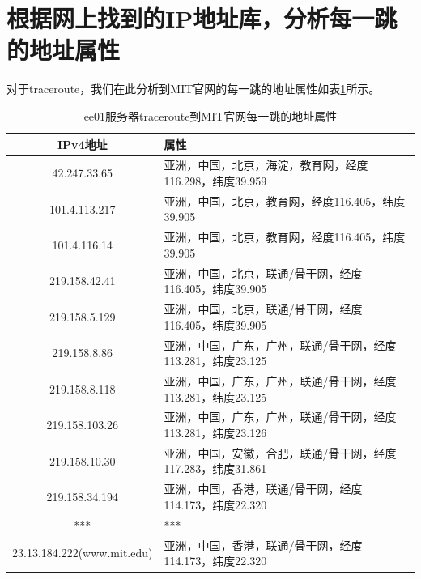 \documentclass[12pt,letterpaper]{article}
\begin{document}
\section{根据网上找到的IP地址库，分析每一跳的地址属性}
对于traceroute，我们在此分析到MIT官网的每一跳的地址属性如表\ref{tab7}所示。
\begin{table}[!h]
	\centering
	\caption{\label{tab7}ee01服务器traceroute到MIT官网每一跳的地址属性}
	\begin{tabular}{|c|p{11.8cm}|}
		\hline
		IPv4地址 & 属性 \\
		\hline
		42.247.33.65 & 亚洲，中国，北京，海淀，教育网，经度116.298，纬度39.959 \\
		\hline
		101.4.113.217 & 亚洲，中国，北京，教育网，经度116.405，纬度39.905 \\
		\hline
		101.4.116.14 & 亚洲，中国，北京，教育网，经度116.405，纬度39.905 \\
		\hline
		219.158.42.41 & 亚洲，中国，北京，联通/骨干网，经度116.405，纬度39.905 \\
		\hline
		219.158.5.129 & 亚洲，中国，北京，联通/骨干网，经度116.405，纬度39.905 \\
		\hline
		219.158.8.86 & 亚洲，中国，广东，广州，联通/骨干网，经度113.281，纬度23.125 \\
		\hline
		219.158.8.118 & 亚洲，中国，广东，广州，联通/骨干网，经度113.281，纬度23.125 \\
		\hline
		219.158.103.26 & 亚洲，中国，广东，广州，联通/骨干网，经度113.281，纬度23.126 \\
		\hline
		219.158.10.30 &  亚洲，中国，安徽，合肥，联通/骨干网，经度117.283，纬度31.861 \\
		\hline
		219.158.34.194 & 亚洲，中国，香港，联通/骨干网，经度114.173，纬度22.320 \\
		\hline
		*** & *** \\
		\hline
		23.13.184.222(www.mit.edu) & 亚洲，中国，香港，联通/骨干网，经度114.173，纬度22.320 \\
		\hline
	\end{tabular}
\end{table}
\end{document}
